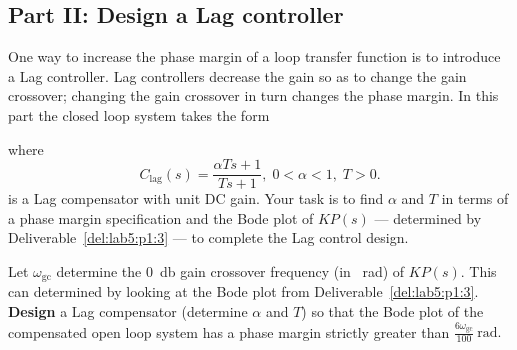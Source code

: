 \subsection{Part II: Design a Lag controller}
One way to increase the phase margin of a loop transfer function is to introduce a Lag controller.
Lag controllers decrease the gain so as to change the gain crossover;
changing the gain crossover in turn changes the phase margin.
In this part the closed loop system takes the form
%
\begin{center}
\end{center}
%
where
\[
  C_\mathrm{lag}(s)
    =
      \frac{\alpha T s + 1}{T s + 1}
  ,
  \;
  0 < \alpha < 1
  ,
  \;
  T > 0.
\]
is a Lag compensator with unit DC gain.
Your task is to find \(\alpha\) and \(T\) in terms of a phase margin specification and the Bode plot of \(K P(s)\) --- determined by Deliverable~\ref{del:lab5:p1:3} --- to complete the Lag control design.
%
\begin{deliverable}[label={del:lab5:p2:1}]
  Let \(\omega_\mathrm{gc}\) determine the \SI{0}{\decibel} gain crossover frequency (in \SI{}{\radian}) of \(K P(s).\) 
  This can determined by looking at the Bode plot from Deliverable~\ref{del:lab5:p1:3}.
  \textbf{Design} a Lag compensator (determine \(\alpha\) and \(T\)) so that the Bode plot of the compensated open loop system has a phase margin strictly greater than \(\frac{6\omega_\mathrm{gc}}{100}~\mathrm{rad}.\)
\end{deliverable}
